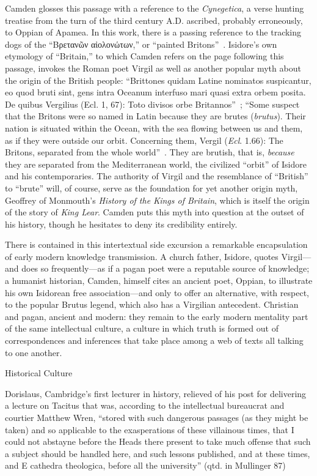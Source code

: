 Camden glosses this passage with a reference to the \emph{Cynegetica}, a verse hunting treatise from the turn of the third century A.D. ascribed, probably erroneously, to Oppian of Apamea. In this work, there is a passing reference to the tracking dogs of the ``Βρετανῶν αἰολονώτων,'' or ``painted Britons''~\cite[1.470]{oppian_1928}. Isidore's own etymology of ``Britain,'' to which Camden refers on the page following this passage, invokes the Roman poet Virgil as well as another popular myth about the origin of the British people: ``Brittones quidam Latine nominatos suspicantur, eo quod bruti sint, gens intra Oceanum interfuso mari quasi extra orbem posita. De quibus Vergilius (Ecl. 1, 67): Toto divisos orbe Britannos''~\cite[9.2.102]{isidore_of_seville_etymologiarum_1911}; ``Some suspect that the Britons were so named in Latin because they are brutes (\emph{brutus}). Their nation is situated within the Ocean, with the sea flowing between us and them, as if they were outside our orbit. Concerning them, Vergil (\emph{Ecl}. 1.66):
The Britons, separated from the whole world''~\cite[198]{isidore_of_seville_etymologies_2006}. They are brutish, that is, \emph{because} they are separated from the Mediterranean world, the civilized ``orbit'' of Isidore and his contemporaries. The authority of Virgil and the resemblance of ``British'' to ``brute'' will, of course, serve as the foundation for yet another origin myth, Geoffrey of Monmouth's \emph{History of the Kings of Britain}, which is itself the origin of the story of \emph{King Lear}. Camden puts this myth into question at the outset of his history, though he hesitates to deny its credibility entirely. 

There is contained in this intertextual side excursion a remarkable encapsulation of early modern knowledge transmission. A church father, Isidore, quotes Virgil---and does so frequently---as if a pagan poet were a reputable source of knowledge; a humanist historian, Camden, himself cites an ancient poet, Oppian, to illustrate his own Isidorean free association---and only to offer an alternative, with respect, to the popular Brutus legend, which also has a Virgilian antecedent. Christian and pagan, ancient and modern: they remain to the early modern mentality part of the same intellectual culture, a culture in which truth is formed out of  correspondences and inferences that take place among a web of texts all talking to one another.

Historical Culture

Dorislaus, Cambridge's first lecturer in history, relieved of his post for delivering a lecture on Tacitus that was, according to the intellectual bureaucrat and courtier Matthew Wren, ``stored with such dangerous passages (as they might be taken) and so applicable to the exasperations of these villainous times, that I could not abstayne before the Heads there present to take much offense that such a subject should be handled here, and such lessons published, and at these times, and E cathedra theologica, before all the university'' (qtd. in Mullinger 87)\nocite{mullinger_university_1911}

